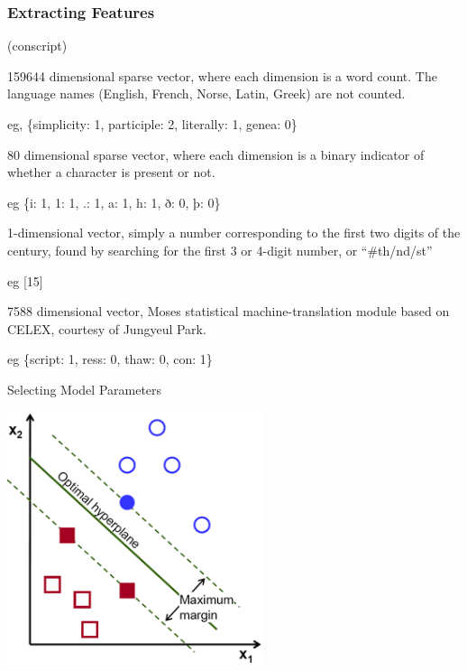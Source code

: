 \documentclass[10pt]{beamer}
\begin{document}
\begin{frame}[fragile]
  \frametitle{Extracting Features}

(conscript)
 
\pause

\begin{description}[<+->]
  \item[Bag-of-Words] 159644 dimensional sparse vector, where each dimension is a word count. The language names (English, French, Norse, Latin, Greek) are not counted. 

  eg, \{simplicity: 1, participle: 2, literally: 1, genea: 0\}

  \item[Characters] 80 dimensional sparse vector, where each dimension is a binary indicator of whether a character is present or not. 

  eg \{i: 1, 1: 1, .: 1, a: 1, h: 1, ð: 0, þ: 0\} 

  \item[Century] 1-dimensional vector, simply a number corresponding to the first two digits of the century, found by searching for the first 3 or 4-digit number, or ``#th/nd/st'' 

  eg [15]

  \item[Syllable] 7588 dimensional vector, Moses statistical machine-translation module based on CELEX, courtesy of Jungyeul Park. 

  eg \{script: 1, ress: 0, thaw: 0, con: 1\}
\end{description}
  
\end{frame}








\begin{frame}[fragile]{Selecting Model Parameters}
  
    \centerline{\includegraphics[width=7.5cm]{svmillustration.png}}


\end{frame}
\end{document}
